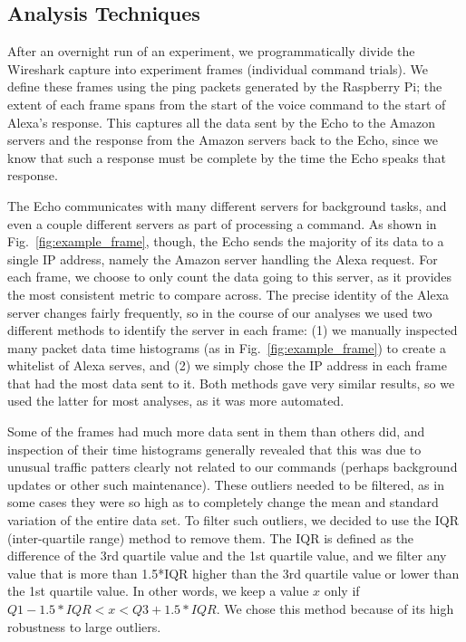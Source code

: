 \subsection{Analysis Techniques}

After an overnight run of an experiment, we programmatically divide the Wireshark capture into experiment frames (individual command trials). We define these frames using the ping packets generated by the Raspberry Pi; the extent of each frame spans from the start of the voice command to the start of Alexa's response. This captures all the data sent by the Echo to the Amazon servers and the response from the Amazon servers back to the Echo, since we know that such a response must be complete by the time the Echo speaks that response.

The Echo communicates with many different servers for background tasks, and even a couple different servers as part of processing a command. As shown in Fig.~\ref{fig:example_frame}, though, the Echo sends the majority of its data to a single IP address, namely the Amazon server handling the Alexa request. For each frame, we choose to only count the data going to this server, as it provides the most consistent metric to compare across. The precise identity of the Alexa server changes fairly frequently, so in the course of our analyses we used two different methods to identify the server in each frame: (1) we manually inspected many packet data time histograms (as in Fig.~\ref{fig:example_frame}) to create a whitelist of Alexa serves, and (2) we simply chose the IP address in each frame that had the most data sent to it. Both methods gave very similar results, so we used the latter for most analyses, as it was more automated.

Some of the frames had much more data sent in them than others did, and inspection of their time histograms generally revealed that this was due to unusual traffic patters clearly not related to our commands (perhaps background updates or other such maintenance). These outliers needed to be filtered, as in some cases they were so high as to completely change the mean and standard variation of the entire data set. To filter such outliers, we decided to use the IQR (inter-quartile range) method to remove them. The IQR is defined as the difference of the 3rd quartile value and the 1st quartile value, and we filter any value that is more than 1.5*IQR higher than the 3rd quartile value or lower than the 1st quartile value. In other words, we keep a value $x$ only if $Q1 - 1.5*IQR < x < Q3 + 1.5*IQR$. We chose this method because of its high robustness to large outliers.



